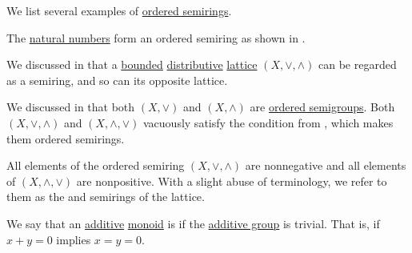 \begin{example}\label{ex:def:ordered_semiring}
  We list several examples of \hyperref[def:ordered_semiring]{ordered semirings}.

  \begin{thmenum}
     The \hyperref[def:natural_numbers]{natural numbers} form an ordered semiring as shown in .

     We discussed in  that a \hyperref[def:semilattice/bounded]{bounded} \hyperref[def:semilattice/distributive_lattice]{distributive} \hyperref[def:semilattice/lattice]{lattice} \( (X, \vee, \wedge) \) can be regarded as a semiring, and so can its opposite lattice.

    We discussed in  that both \( (X, \vee) \) and \( (X, \wedge) \) are \hyperref[def:ordered_semigroup]{ordered semigroups}. Both \( (X, \vee, \wedge) \) and \( (X, \wedge, \vee) \) vacuously satisfy the condition from , which makes them ordered semirings.

    All elements of the ordered semiring \( (X, \vee, \wedge) \) are nonnegative and all elements of \( (X, \wedge, \vee) \) are nonpositive. With a slight abuse of terminology, we refer to them as the  and  semirings of the lattice.
  \end{thmenum}
\end{example}

\begin{definition}\label{def:zerosumfree}
  We say that an \hyperref[rem:additive_semigroup]{additive} \hyperref[def:monoid]{monoid} is  if the \hyperref[thm:invertible_submonoid_is_group]{additive group} is trivial. That is, if \( x + y = 0 \) implies \( x = y = 0 \).
\end{definition}

